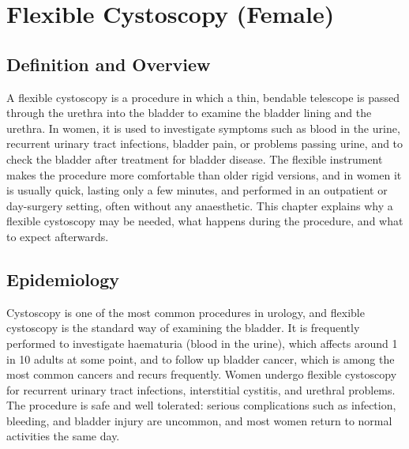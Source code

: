 \chapter{Flexible Cystoscopy (Female)}

\section*{Definition and Overview}
A flexible cystoscopy is a procedure in which a thin, bendable telescope is passed through the urethra into the bladder to examine the bladder lining and the urethra. In women, it is used to investigate symptoms such as blood in the urine, recurrent urinary tract infections, bladder pain, or problems passing urine, and to check the bladder after treatment for bladder disease. The flexible instrument makes the procedure more comfortable than older rigid versions, and in women it is usually quick, lasting only a few minutes, and performed in an outpatient or day-surgery setting, often without any anaesthetic. This chapter explains why a flexible cystoscopy may be needed, what happens during the procedure, and what to expect afterwards.

\section*{Epidemiology}
Cystoscopy is one of the most common procedures in urology, and flexible cystoscopy is the standard way of examining the bladder. It is frequently performed to investigate haematuria (blood in the urine), which affects around 1 in 10 adults at some point, and to follow up bladder cancer, which is among the most common cancers and recurs frequently. Women undergo flexible cystoscopy for recurrent urinary tract infections, interstitial cystitis, and urethral problems. The procedure is safe and well tolerated: serious complications such as infection, bleeding, and bladder injury are uncommon, and most women return to normal activities the same day.

